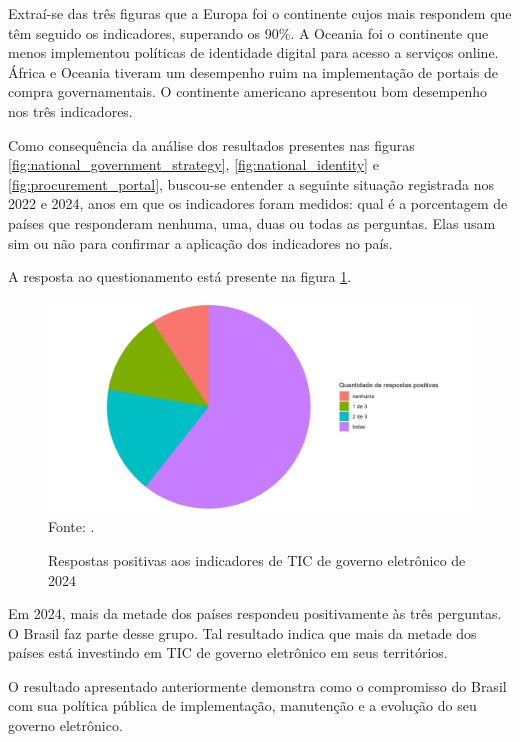 Extraí-se das três figuras que a Europa foi o continente cujos mais respondem que têm seguido os indicadores, superando os 90\%. A Oceania foi o continente que menos implementou políticas de identidade digital para acesso a serviços online. África e Oceania tiveram um desempenho ruim na implementação de portais de compra governamentais. O continente americano apresentou bom desempenho nos três indicadores.

Como consequência da análise dos resultados presentes nas figuras \ref{fig:national_government_strategy}, \ref{fig:national_identity} e \ref{fig:procurement_portal}, buscou-se entender a seguinte situação registrada nos 2022 e 2024, anos em que os indicadores foram medidos: qual é a porcentagem de países que responderam nenhuma, uma, duas ou todas as perguntas. Elas usam sim ou não para confirmar a aplicação dos indicadores no país.

A resposta ao questionamento está presente na figura \ref{fig:ticegov_soma_respostas_positivas}.

\begin{figure}[H]
	\centering
	\caption{Respostas positivas aos indicadores de TIC de governo eletrônico de 2024}
	\includegraphics[width=1\linewidth]{figuras/ticegov_soma_respostas_positivas}
	\label{fig:ticegov_soma_respostas_positivas}
	\footnotesize{Fonte: \cite{ONU_ICT_in_government_indicators}.}
\end{figure}

Em 2024, mais da metade dos países respondeu positivamente às três perguntas. O Brasil faz parte desse grupo. Tal resultado indica que mais da metade dos países está investindo em TIC de governo eletrônico em seus territórios.

O resultado apresentado anteriormente demonstra como o compromisso do Brasil com sua política pública de implementação, manutenção e a evolução do seu governo eletrônico.


